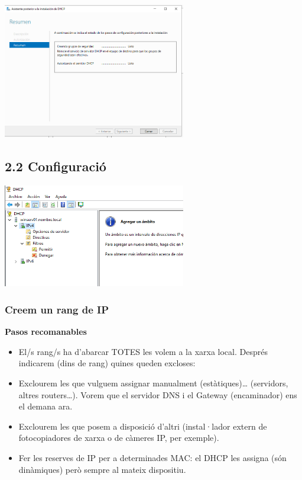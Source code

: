 \documentclass[
  a4paper,
]{article}
\begin{document}
\includegraphics[width=0.6\textwidth,height=\textheight]{png/DHCP6.png}

\subsection{2.2 Configuració}\label{configuraciuxf3}

\includegraphics[width=0.6\textwidth,height=\textheight]{png/DHCP7.png}

\subsubsection{Creem un rang de IP}\label{creem-un-rang-de-ip}

\textbf{Pasos recomanables}

\begin{itemize}
\item
  El/s rang/s ha d'abarcar TOTES les volem a la xarxa local. Després
  indicarem (dins de rang) quines queden excloses:
\item
  Exclourem les que vulguem assignar manualment (estàtiques)\ldots{}
  (servidors, altres routers\ldots). Vorem que el servidor DNS i el
  Gateway (encaminador) ens el demana ara.
\item
  Exclourem les que posem a disposició d'altri (instal·lador extern de
  fotocopiadores de xarxa o de càmeres IP, per exemple).
\item
  Fer les reserves de IP per a determinades MAC: el DHCP les assigna
  (són dinàmiques) però sempre al mateix dispositiu.
\end{itemize}
\end{document}
